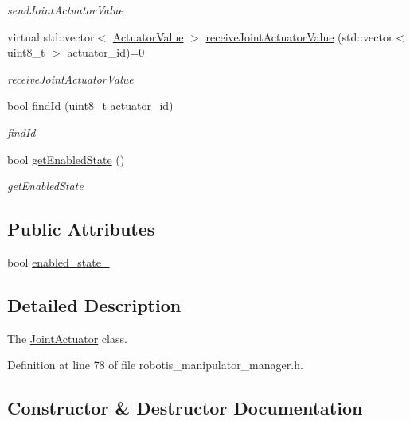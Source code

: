 \begin{DoxyCompactItemize}
\begin{DoxyCompactList}\small\item\em send\+Joint\+Actuator\+Value \end{DoxyCompactList}\item 
virtual std\+::vector$<$ \hyperlink{namespacerobotis__manipulator_a26f478d98222f9ce1bf66c7df248037b}{Actuator\+Value} $>$ \hyperlink{classrobotis__manipulator_1_1_joint_actuator_a19c2c68427ec015516709dbe6b284688}{receive\+Joint\+Actuator\+Value} (std\+::vector$<$ uint8\+\_\+t $>$ actuator\+\_\+id)=0
\begin{DoxyCompactList}\small\item\em receive\+Joint\+Actuator\+Value \end{DoxyCompactList}\item 
bool \hyperlink{classrobotis__manipulator_1_1_joint_actuator_a1d096f6f6de5506e003ba05621ec5d33}{find\+Id} (uint8\+\_\+t actuator\+\_\+id)
\begin{DoxyCompactList}\small\item\em find\+Id \end{DoxyCompactList}\item 
bool \hyperlink{classrobotis__manipulator_1_1_joint_actuator_aff85f4ec7a489e770c4f6130cdf961ae}{get\+Enabled\+State} ()
\begin{DoxyCompactList}\small\item\em get\+Enabled\+State \end{DoxyCompactList}\end{DoxyCompactItemize}
\subsection*{Public Attributes}
\begin{DoxyCompactItemize}
\item 
bool \hyperlink{classrobotis__manipulator_1_1_joint_actuator_a62a6eaa962983ecd3948d5b9fecae79b}{enabled\+\_\+state\+\_\+}
\end{DoxyCompactItemize}


\subsection{Detailed Description}
The \hyperlink{classrobotis__manipulator_1_1_joint_actuator}{Joint\+Actuator} class. 

Definition at line 78 of file robotis\+\_\+manipulator\+\_\+manager.\+h.



\subsection{Constructor \& Destructor Documentation}
